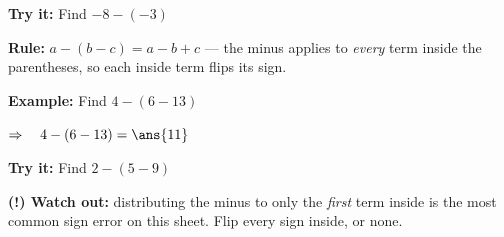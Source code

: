 \documentclass[12pt]{article}
\begin{document}
\begin{tryitbox}
\textbf{Try it:} \quad Find $-8 - (-3)$\\[2pt]
\end{tryitbox}


\begin{formulabox}
\textbf{Rule:} \quad $a - (b - c) = a - b + c$ \quad --- the minus applies to
\emph{every} term inside the parentheses, so each inside term flips its sign.
\end{formulabox}

\begin{examplebox}
\textbf{Example:} \quad Find $4 - (6 - 13)$

$\Rightarrow\quad 4 - (6 - 13) = \ans{11}$
\end{examplebox}

\begin{tryitbox}
\textbf{Try it:} \quad Find $2 - (5 - 9)$\\[2pt]
\end{tryitbox}

\begin{watchoutbox}
\textbf{(!) Watch out:} distributing the minus to only the \emph{first} term inside is
the most common sign error on this sheet. Flip every sign inside, or none.
\end{watchoutbox}
\end{document}
